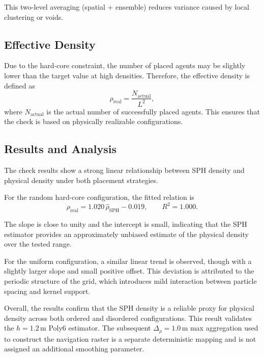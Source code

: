 \documentclass[preprint,12pt]{elsarticle}
\providecommand{\FloatBarrier}{}
\let\origsubsection\subsection
\renewcommand{\subsection}{\FloatBarrier\origsubsection}
\begin{document}
This two-level averaging (spatial + ensemble) reduces variance
caused by local clustering or voids.


\subsection{Effective Density}
\label{app:effective_density}

Due to the hard-core constraint, the number of placed agents may be slightly
lower than the target value at high densities. Therefore, the effective density
is defined as
\begin{equation}
\rho_{\mathrm{real}}
=
\frac{N_{\mathrm{actual}}}{L^2},
\end{equation}
where $N_{\mathrm{actual}}$ is the actual number of successfully placed agents.
This ensures that the check is based on physically realizable configurations.


\subsection{Results and Analysis}
\label{app:calib_results}

The check results show a strong linear relationship between SPH density
and physical density under both placement strategies.

For the random hard-core configuration, the fitted relation is
\begin{equation}
\rho_{\mathrm{real}}
=
1.020\,\hat{\rho}_{\mathrm{SPH}} - 0.019,
\qquad
R^2 = 1.000.
\end{equation}

The slope is close to unity and the intercept is small, indicating that
the SPH estimator provides an approximately unbiased estimate of the
physical density over the tested range.

For the uniform configuration, a similar linear trend is observed, though with
a slightly larger slope and small positive offset. This deviation is attributed
to the periodic structure of the grid, which introduces mild interaction
between particle spacing and kernel support.

Overall, the results confirm that the SPH density is a reliable proxy for
physical density across both ordered and disordered configurations. This
result validates the $h=1.2$\,m Poly6 estimator. The subsequent
$\Delta_\rho=1.0$\,m max aggregation used to construct the navigation
raster is a separate deterministic mapping and is not assigned an
additional smoothing parameter.
\end{document}
